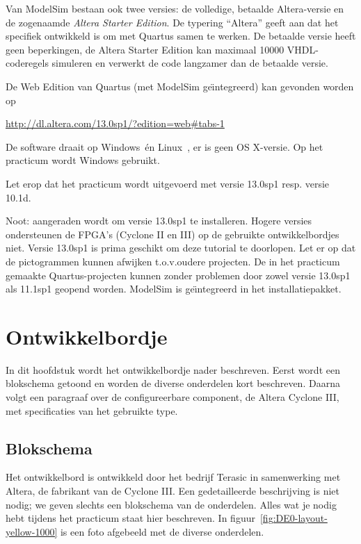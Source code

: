\documentclass[a4paper,12pt,fleqn,twoside]{book}
\begin{document}
Van ModelSim bestaan ook twee versies: de volledige, betaalde Altera-versie en
de zogenaamde \textsl{Altera Starter Edition}. De typering ``Altera'' geeft aan
dat het specifiek ontwikkeld is om met Quartus samen te werken. De betaalde
versie heeft geen beperkingen, de Altera Starter Edition kan maximaal 10000
VHDL-coderegels simuleren en verwerkt de code langzamer dan de betaalde versie.

De Web Edition van Quartus (met ModelSim ge\"{\i}ntegreerd) kan gevonden
worden op

\hspace*{1cm}\url{http://dl.altera.com/13.0sp1/?edition=web#tabs-1}

%

De software draait op Windows\texttrademark\ \'{e}n Linux\texttrademark\ , er
is geen OS X-versie. Op het practicum wordt Windows gebruikt.

Let erop dat het practicum wordt uitgevoerd met versie 13.0sp1 resp\@. versie
10.1d.

Noot: aangeraden wordt om versie 13.0sp1 te installeren. Hogere versies
ondersteunen de FPGA's (Cyclone II en III) op de gebruikte ontwikkelbordjes
niet. Versie 13.0sp1 is prima geschikt om deze tutorial te doorlopen. Let er
op dat de pictogrammen kunnen afwijken t.o.v.\@ oudere projecten. De in
het practicum gemaakte Quartus-projecten
kunnen zonder problemen door zowel versie 13.0sp1 als 11.1sp1 geopend worden.
ModelSim is ge\"{\i}ntegreerd in het installatiepakket.




\chapter{Ontwikkelbordje}
\label{chap:ontwikkelbordje}
In dit hoofdstuk wordt het ontwikkelbordje nader beschreven. Eerst wordt een
blokschema getoond en worden de diverse onderdelen kort beschreven. Daarna
volgt een paragraaf over de configureerbare component, de Altera Cyclone III,
met specificaties van het gebruikte type.


\section{Blokschema}
\label{sec:blokschema}
Het ontwikkelbord is ontwikkeld door het bedrijf Terasic in samenwerking met
Altera, de fabrikant van de Cyclone III. Een gedetailleerde beschrijving is
niet nodig; we geven slechts een blokschema van de onderdelen. Alles wat je
nodig hebt tijdens het practicum staat hier beschreven. In
figuur~\ref{fig:DE0-layout-yellow-1000} is een foto afgebeeld met de diverse
onderdelen.
\end{document}
